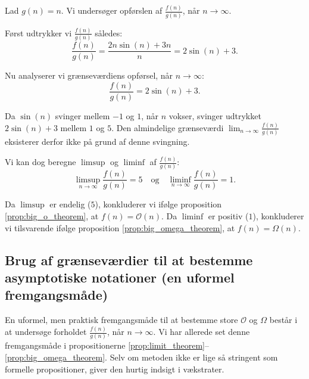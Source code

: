                 \begin{solution}
                Lad \( g(n) = n \). Vi undersøger opførslen af \( \frac{f(n)}{g(n)} \), når \( n \to \infty \).
                
                Først udtrykker vi \( \frac{f(n)}{g(n)} \) således:
                \[
                \frac{f(n)}{g(n)} = \frac{2n \sin(n) + 3n}{n} = 2 \sin(n) + 3.
                \]
                
                Nu analyserer vi grænseværdiens opførsel, når \( n \to \infty \):
                \[
                \frac{f(n)}{g(n)} = 2 \sin(n) + 3.
                \]
                
                Da \( \sin(n) \) svinger mellem \( -1 \) og \( 1 \), når \( n \) vokser, svinger udtrykket \( 2 \sin(n) + 3 \) mellem \( 1 \) og \( 5 \). Den almindelige grænseværdi \( \lim_{n \to \infty} \frac{f(n)}{g(n)} \) eksisterer derfor ikke på grund af denne svingning.
                
                Vi kan dog beregne \(\limsup\) og \(\liminf\) af \( \frac{f(n)}{g(n)} \):
                \[
                \limsup_{n \to \infty} \frac{f(n)}{g(n)} = 5 \quad \text{og} \quad \liminf_{n \to \infty} \frac{f(n)}{g(n)} = 1.
                \]
                
                Da \(\limsup\) er endelig (\(5\)), konkluderer vi ifølge proposition \ref{prop:big_o_theorem}, at \( f(n) = \mathcal{O}(n) \). Da \(\liminf\) er positiv (\(1\)), konkluderer vi tilsvarende ifølge proposition \ref{prop:big_omega_theorem}, at \( f(n) = \Omega(n) \).
                \end{solution}
                
                
                

        \subsection*{Brug af grænseværdier til at bestemme asymptotiske notationer (en uformel fremgangsmåde)}

        En uformel, men praktisk fremgangsmåde til at bestemme store $\mathcal{O}$ og $\Omega$ består i at undersøge forholdet \( \frac{f(n)}{g(n)} \), når \( n \to \infty \). Vi har allerede set denne fremgangsmåde i propositionerne \ref{prop:limit_theorem}--\ref{prop:big_omega_theorem}. Selv om metoden ikke er lige så stringent som formelle propositioner, giver den hurtig indsigt i vækstrater.
        

